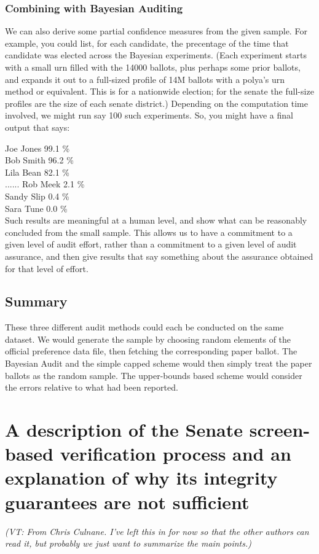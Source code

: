 \documentclass[10pt,a4paper]{article}
\newcommand{\VTNote}[1]{{\it(VT: #1)}}
\begin{document}
\subsubsection{Combining with Bayesian Auditing} 
We can also derive some partial confidence measures from the
given sample.  For example, you could list, for each candidate,
the precentage of the time that candidate was elected across the Bayesian
experiments.  (Each experiment starts with a small urn filled with
the 14000 ballots, plus perhaps some prior ballots, and expands
it out to a full-sized profile of 14M ballots with a polya's urn
method or equivalent.  This is for a nationwide election; for the
senate the full-size profiles are the size of each senate district.)
Depending on the computation time involved, we might run say
100 such experiments.  So, you might have a final output that says:

Joe Jones     99.1 \% \\
Bob Smith     96.2 \% \\
Lila Bean       82.1 \% \\
......
Rob Meek        2.1 \% \\ 
Sandy Slip       0.4 \%   \\
Sara Tune        0.0 \%   \\

Such results are meaningful at a human level, and show
what can be reasonably concluded from the small sample.
This allows us to have a commitment to a given
level of audit effort, rather than a commitment to a given level
of audit assurance, and then give results that say something about
the assurance obtained for that level of effort.


\subsection{Summary}
These three different audit methods could each be conducted on the same dataset.  We would generate the sample by choosing random elements of the official preference data file, then fetching the corresponding paper ballot.  The Bayesian Audit and the simple capped scheme would then simply treat the paper ballots as the random sample.  The upper-bounds based scheme would consider the errors relative to what had been reported.

\section{A description of the Senate screen-based verification process and an explanation of why its integrity guarantees are not sufficient}
\VTNote{From Chris Culnane.  I've left this in for now so that the other authors can read it, but probably we just want to summarize the main points.}
\end{document}
